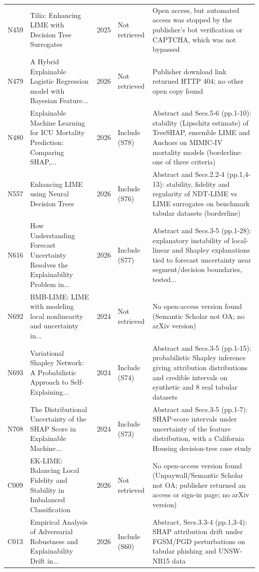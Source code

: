 \begin{longtable}{@{}P{1.0cm}P{6.3cm}P{0.7cm}P{1.6cm}P{6.1cm}@{}}
N459 & Tilia: Enhancing LIME with Decision Tree Surrogates & 2025 & Not retrieved & Open access, but automated access was stopped by the publisher's bot verification or CAPTCHA, which was not bypassed \\
N479 & A Hybrid Explainable Logistic Regression model with Bayesian Feature... & 2026 & Not retrieved & Publisher download link returned HTTP 404; no other open copy found \\
N480 & Explainable Machine Learning for ICU Mortality Prediction: Comparing SHAP,... & 2026 & Include (S78) & Abstract and Secs.5-6 (pp.1-10): stability (Lipschitz estimate) of TreeSHAP, ensemble LIME and Anchors on MIMIC-IV mortality models (borderline: one of three criteria) \\
N557 & Enhancing LIME using Neural Decision Trees & 2026 & Include (S76) & Abstract and Secs.2.2-4 (pp.1,4-13): stability, fidelity and regularity of NDT-LIME vs LIME surrogates on benchmark tabular datasets (borderline) \\
N616 & How Understanding Forecast Uncertainty Resolves the Explainability Problem in... & 2026 & Include (S77) & Abstract and Secs.3-5 (pp.1-28): explanatory instability of local-linear and Shapley explanations tied to forecast uncertainty near segment/\allowbreak{}decision boundaries, tested... \\
N692 & BMB-LIME: LIME with modeling local nonlinearity and uncertainty in... & 2024 & Not retrieved & No open-access version found (Semantic Scholar not OA; no arXiv version) \\
N693 & Variational Shapley Network: A Probabilistic Approach to Self-Explaining... & 2024 & Include (S74) & Abstract and Secs.3-5 (pp.1-15): probabilistic Shapley inference giving attribution distributions and credible intervals on synthetic and 8 real tabular datasets \\
N708 & The Distributional Uncertainty of the SHAP Score in Explainable Machine... & 2024 & Include (S73) & Abstract and Secs.3-5 (pp.1-7): SHAP-score intervals under uncertainty of the feature distribution, with a California Housing decision-tree case study \\
C009 & EK-LIME: Balancing Local Fidelity and Stability in Imbalanced Classification & 2026 & Not retrieved & No open-access version found (Unpaywall/\allowbreak{}Semantic Scholar not OA; publisher returned an access or sign-in page; no arXiv version) \\
C013 & Empirical Analysis of Adversarial Robustness and Explainability Drift in... & 2026 & Include (S60) & Abstract, Secs.3.3-4 (pp.1,3-4): SHAP attribution drift under FGSM/\allowbreak{}PGD perturbations on tabular phishing and UNSW-NB15 data \\

\end{longtable}
